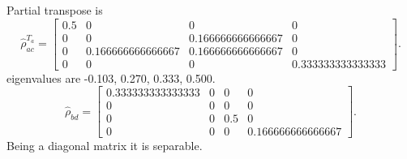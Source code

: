 \documentclass{amsart}
\theoremstyle{plain}
\theoremstyle{definition}
\theoremstyle{plain}
\begin{document}
Partial transpose  is
\begin{equation*}
	\hat{\rho}_{ac}^{T_a} = \left[\begin{matrix}0.5 & 0 & 0 & 0\\0 & 0 & 0.166666666666667 & 0\\0 & 0.166666666666667 & 0.166666666666667 & 0\\0 & 0 & 0 & 0.333333333333333\end{matrix}\right].
\end{equation*}
eigenvalues are -0.103, 0.270, 0.333, 0.500.
\begin{equation*}
	\hat{\rho}_{bd} = \left[\begin{matrix}0.333333333333333 & 0 & 0 & 0\\0 & 0 & 0 & 0\\0 & 0 & 0.5 & 0\\0 & 0 & 0 & 0.166666666666667\end{matrix}\right]
	.
\end{equation*}
Being a diagonal matrix it is separable.
\end{document}
